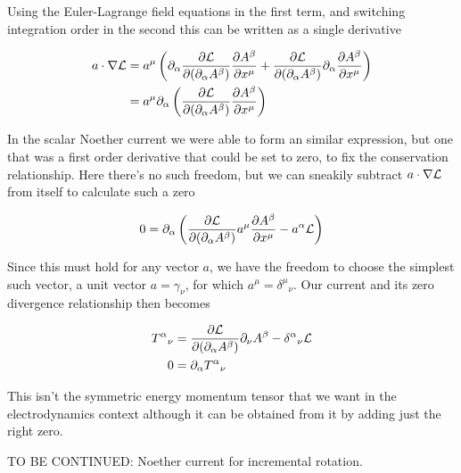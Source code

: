 Using the Euler-Lagrange field equations in the first term, and switching integration order in the second this can be written as a single derivative

\begin{align*}
a \cdot \grad \LL
&=
a^\mu \left(
\partial_\alpha \PD{(\partial_\alpha A^\beta)}{\LL} \PD{x^\mu}{A^\beta}
+\PD{(\partial_\alpha A^\beta)}{\LL} \partial_\alpha \PD{x^\mu}{A^\beta}
\right) \\
&=
a^\mu \partial_\alpha \left(
\PD{(\partial_\alpha A^\beta)}{\LL} \PD{x^\mu}{A^\beta}
\right) \\
\end{align*}

In the scalar Noether current we were able to form an similar expression, but one that was a first order derivative that could be set to zero, to fix the conservation relationship.  Here there's no such freedom, but we can sneakily subtract $a \cdot \grad \LL$ from itself to calculate such a zero

\begin{align}\label{eqn:rotationCurrents:goo8}
0 =
\partial_\alpha \left(
\PD{(\partial_\alpha A^\beta)}{\LL} a^\mu \PD{x^\mu}{A^\beta} - a^\alpha \LL
\right) 
\end{align}

Since this must hold for any vector $a$, we have the freedom to choose the simplest such vector, a unit vector $a = \gamma_\nu$, for which $a^\mu = {\delta^\mu}_\nu$.  Our current and its zero divergence relationship then becomes

\begin{align}\label{eqn:rotationCurrents:goo9}
{T^\alpha}_\nu &= \PD{(\partial_\alpha A^\beta)}{\LL} \partial_\nu A^\beta - {\delta^\alpha}_\nu \LL \\
0 &= \partial_\alpha {T^\alpha}_\nu 
\end{align}

This isn't the symmetric energy momentum tensor that we want in the electrodynamics context although it can be obtained from it by adding just the right zero.

TO BE CONTINUED: Noether current for incremental rotation.

\EndArticle
